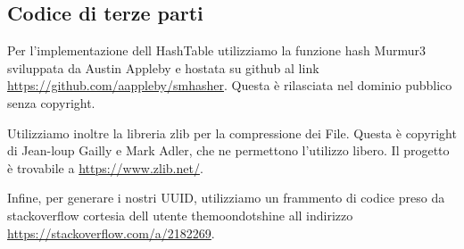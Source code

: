 \documentclass[11pt]{article}
\begin{document}
\begin{flushleft}
\subsection{Codice di terze parti}
Per l'implementazione dell HashTable utilizziamo la funzione hash Murmur3 sviluppata da Austin Appleby e hostata su github al link \url{https://github.com/aappleby/smhasher}. Questa è rilasciata nel dominio pubblico senza copyright.

Utilizziamo inoltre la libreria zlib per la compressione dei File. Questa è copyright di Jean-loup Gailly e Mark Adler, che ne permettono l'utilizzo libero. Il progetto è trovabile a \url{https://www.zlib.net/}.

Infine, per generare i nostri UUID, utilizziamo un frammento di codice preso da stackoverflow cortesia dell utente themoondotshine all indirizzo \url{https://stackoverflow.com/a/2182269}.

\end{flushleft}
\end{document}
